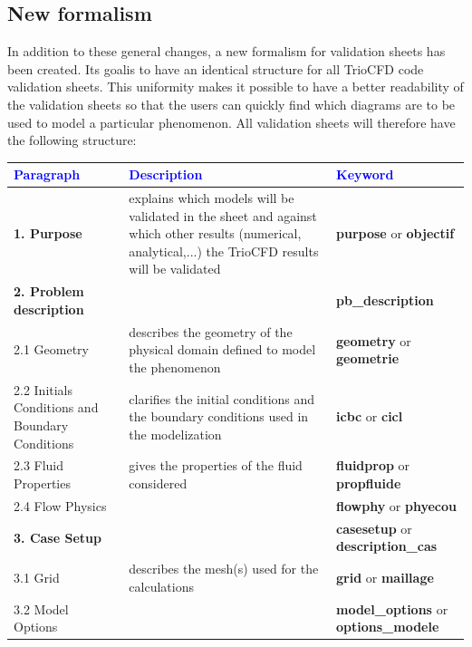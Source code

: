\subsection*{New formalism}
In addition to these general changes, a new formalism for validation sheets has been created. Its goalis to have an identical structure for all TrioCFD code validation sheets. This uniformity makes it possible to have a better readability of the validation sheets so that the users can quickly find which diagrams are to be used to model a particular phenomenon.
All validation sheets will therefore have the following structure:\medskip\newline
\setlength{\tabcolsep}{0.1cm}
\renewcommand{\arraystretch}{1.75}
\begin{tabular*}{16cm}{|m{5.75cm}|m{6.5cm}|m{3.25cm}|}
\hline
\textcolor{blue}{\textbf{Paragraph}} & \textcolor{blue}{\textbf{Description}} & \textcolor{blue}{\textbf{Keyword}} \\ \hline
\textbf{1. Purpose} & explains which models will be validated in the sheet and against which other results (numerical, analytical,...) the TrioCFD results will be validated& \textbf{purpose} or \textbf{objectif} \\ \hline
\textbf{2. Problem description} & & \textbf{pb\_description} \\
\hspace{0.2cm} 2.1 Geometry & describes the geometry of the physical domain defined to model the phenomenon & \textbf{geometry} or \textbf{geometrie} \\
\hspace{0.2cm} 2.2 Initials Conditions and Boundary Conditions & clarifies the initial conditions and the boundary conditions used in the modelization & \textbf{icbc} or \textbf{cicl} \\
\hspace{0.2cm} 2.3 Fluid Properties & gives the properties of the fluid considered& \textbf{fluidprop} or \textbf{propfluide} \\
\hspace{0.2cm} 2.4 Flow Physics & & \textbf{flowphy} or \textbf{phyecou} \\ \hline
\textbf{3. Case Setup} & & \textbf{casesetup} or \textbf{description\_cas} \\
\hspace{0.2cm} 3.1 Grid & describes the mesh(s) used for the calculations & \textbf{grid} or \textbf{maillage} \\
\hspace{0.2cm} 3.2 Model Options & & \textbf{model\_options} or \textbf{options\_modele} \\

\end{tabular*}
